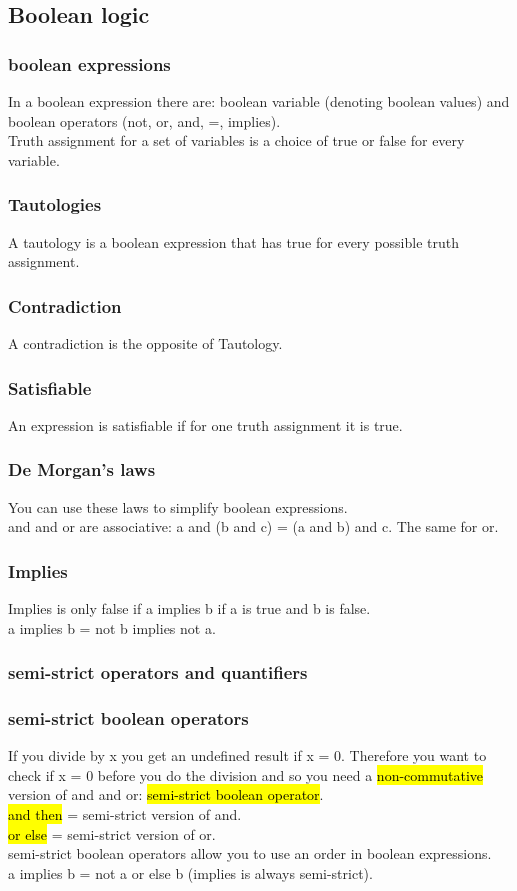 \documentclass[11pt]{article}
\begin{document}
\subsection{Boolean logic}
\subsubsection{boolean expressions}
In a boolean expression there are: boolean variable (denoting boolean values) and boolean operators (not, or, and, =, implies).\\Truth assignment for a set of variables is a choice of true or false for every variable.
\subsubsection{Tautologies}
A tautology is a boolean expression that has true for every possible truth assignment.
\subsubsection{Contradiction}
A contradiction is the opposite of Tautology.
\subsubsection{Satisfiable}
An expression is satisfiable if for one truth assignment it is true.
\subsubsection{De Morgan's laws}
You can use these laws to simplify boolean expressions.\\ and and or are associative: a and (b and c) = (a and b) and c. The same for or.
\subsubsection{Implies}
Implies is only false if a implies b if a is true and b is false.\\a implies b = not b implies not a.
\subsubsection{semi-strict operators and quantifiers}
\subsubsection{semi-strict boolean operators}
If you divide by x you get an undefined result if x = 0. Therefore you want to check if x = 0 before you do the division and so you need a \hl{non-commutative} version of and and or: \hl{semi-strict boolean operator}.
\\\hl{and then} = semi-strict version of and.\\\hl{or else} = semi-strict version of or.\\semi-strict boolean operators allow you to use an order in boolean expressions.\\
a implies b =  not a or else b (implies is always semi-strict).
\end{document}
